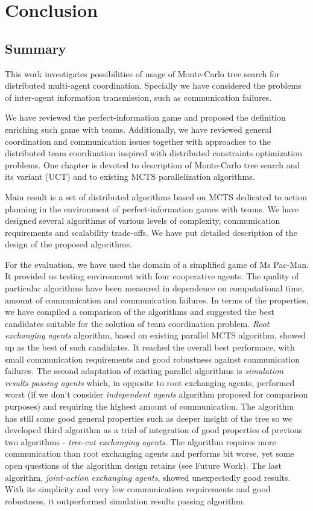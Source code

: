 \chapter*{Conclusion}


\section*{Summary}

This work investigates possibilities of usage of Monte-Carlo tree search for distributed
multi-agent 
coordination. Specially we have considered the problems of inter-agent information
transmission, such as communication failures.

We have reviewed the
perfect-information game and proposed the definition enriching such game with teams.
Additionally, we have reviewed general coordination and communication issues together with
approaches to the distributed team coordination inspired with distributed constraints
optimization problems. One chapter is devoted to description of Monte-Carlo tree search and its
variant (UCT) and to existing MCTS parallelization algorithms.

Main result is a set of distributed algorithms based on MCTS dedicated to action planning in
the environment of perfect-information games with teams. We have designed several algorithms of
various levels of complexity, communication requirements and scalability trade-offs. We have
put detailed description of the design of the proposed algorithms. 

For the
evaluation, we have used the domain of a simplified game of Ms Pac-Man. It provided us testing 
environment with four cooperative agents. The quality of particular algorithms have been
measured in dependence on computational time, amount of communication and communication
failures. In terms of the properties, we have compiled a comparison of the algorithms and
suggested the best candidates suitable for the solution of team coordination problem.
\emph{Root exchanging agents} algorithm, based on existing parallel MCTS algorithm,
showed up as the best of such candidates. It reached 
the overall best
performace, with small communication requirements and good robustness against communication
failures. The second adaptation of existing parallel algorithms is \emph{simulation results
passing agents} which, in opposite to root exchanging agents, performed worst (if we don't
consider \emph{independent agents} algorithm proposed for comparison purposes) and requiring
the highest amount of communication. The algorithm has still some good general properties such
as deeper insight of the tree so we developed third algorithm as a trial of integration of good
properties of previous two algorithms - \emph{tree-cut exchanging agents}. The algorithm
requires more communication than root exchanging agents and performs bit worse, yet some open 
questions of the algorithm design retains (see Future Work). The last algorithm,
\emph{joint-action exchanging agents}, showed unexpectedly good results. With its simplicity
and very low communication requirements and good robustness, it outperformed simulation results 
passing algorithm.

